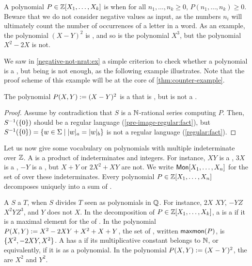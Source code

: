 \AP A polynomial $P \in \mathbb{Z}[X_1, \dots, X_k]$ is  when for
all $n_1, \dots, n_k \geq 0$, $P(n_1, \dots, n_k) \geq 0$. Beware that we do
not consider negative values as input, as the numbers $n_i$ will ultimately
count the number of occurrences of a letter in a word. As an example, the
polynomial $(X - Y)^2$ is , and so is the polynomial $X^3$,
but the polynomial $X^2 - 2X$ is not.

We saw in \cref{negative-not-nrat:ex} a simple criterion to check whether a
polynomial is a , but being  is
not enough, as the following example illustrates. Note that the proof scheme of
this example will be at the core of \cref{thm:counter-example}.

\begin{example}
    The polynomial $P(X, Y) \mathrel{:=} (X - Y)^2$
    is a  that is ,
    but is
    not a .
\end{example}
\begin{proof}
    Assume by contradiction that
    $S$ is a $\mathbb{N}$-rational series computing $P$.
    Then, $S^{-1}(\mathopen{\{} 0 \mathclose{\}})$ should be a regular language
    (\cref{pre-image-regular:fact}),
    but $S^{-1}(\set{0}) = \setof{ w \in \Sigma }{ \card[a]{w} = \card[b]{w} }$
    is not a regular language (\cref{regular:fact}).
\end{proof}


\AP Let us now give some vocabulary on polynomials with multiple indeterminate
over $\mathbb{Z}$. A  is a product of indeterminates and integers.
For instance, $XY$ is a , $3 X$ is a , $-Y$ is a
, but $X + Y$ or $2X^2 + XY$ are not. We write $\Monomials[X_1,
\dots, X_n]$ for the set of  over these indeterminates.
Every polynomial $P \in \mathbb{Z}[X_1, \dots, X_n]$ decomposes uniquely
into a sum of .

\AP A  $S$  a  $T$, when $S$ divides
$T$ seen as polynomials in $\mathbb{Q}$. For instance, $2X$  $XY$, $-YZ$
 $X^2 Y Z^3$, and $Y$ does not  $X$. In the
decomposition of $P \in \mathbb{Z}[X_1, \dots, X_k]$, a  is a
 if it is a maximal element for the  of . In the polynomial $P(X,Y) \mathrel{:=} X^2 - 2XY + X^2
+ X + Y$, the set of , written
$\mathop{\mathsf{maxmon}}(P)$, is $\mathopen{\{} X^2,  -2 XY,  X^2 \mathclose{\}}$. A  has a
 if its multiplicative constant belongs to
$\mathbb{N}$, or equivalently, if it is  as a polynomial. In the
polynomial $P(X,Y) \mathrel{:=} (X - Y)^2$, the  are $X^2$
and $Y^2$.




